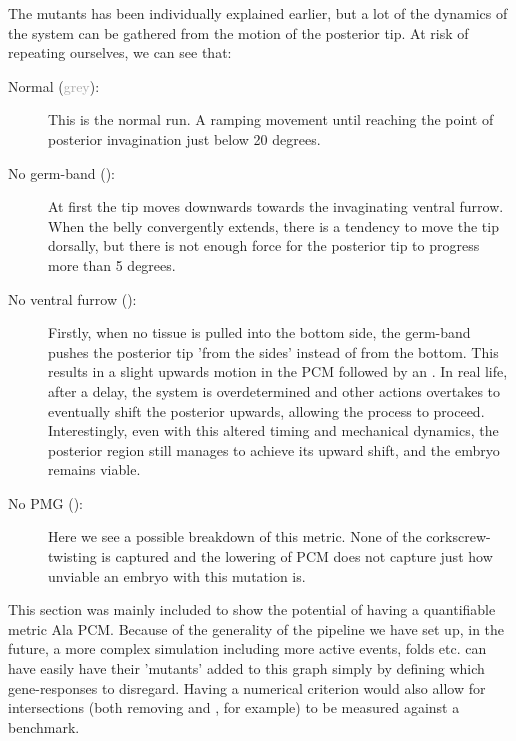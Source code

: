 \begin{figure}[H]
    \label{fig:PCM-mutants}
\end{figure}


The mutants has been individually explained earlier, but a lot of the dynamics of the system can be gathered from the motion of the posterior tip. At risk of repeating ourselves, we can see that:\\
\begin{description}
    \item[Normal (\textcolor{darkgray}{grey}):] This is the normal run. A ramping movement until reaching the point of posterior invagination just below 20 degrees. 
    \item[No germ-band ():] At first the tip moves downwards towards the invaginating ventral furrow. When the belly convergently extends, there is a tendency to move the tip dorsally, but there is not enough force for the posterior tip to progress more than 5 degrees. 
    \item[No ventral furrow ():] Firstly, when no tissue is pulled into the bottom side, the germ-band pushes the posterior tip 'from the sides' instead of from the bottom. This results in a slight upwards motion in the PCM followed by an . In real life, after a delay, the system is overdetermined and other actions overtakes to eventually shift the posterior upwards, allowing the process to proceed. Interestingly, even with this altered timing and mechanical dynamics, the posterior region still manages to achieve its upward shift, and the embryo remains viable. 
    \item[No PMG ():]  Here we see a possible breakdown of this metric. None of the corkscrew-twisting is captured and the lowering of PCM does not capture just how unviable an embryo with this mutation is.  
\end{description}

This section was mainly included to show the potential of having a quantifiable metric Ala PCM. Because of the generality of the pipeline we have set up, in the future, a more complex simulation including more active events, folds etc. can have easily have their 'mutants' added to this graph simply by defining which gene-responses to disregard. Having a numerical criterion would also allow for intersections (both removing  and , for example) to be measured against a benchmark.


